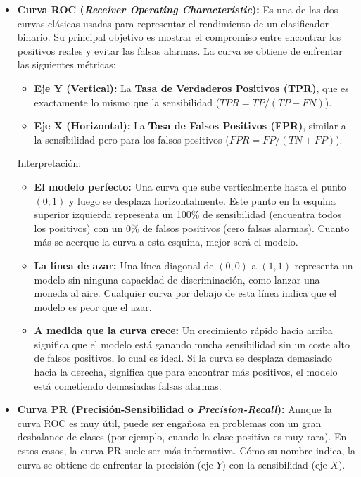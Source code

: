 \begin{itemize}
	\item \textbf{Curva ROC (\textit{Receiver Operating Characteristic}):} Es una de las dos curvas clásicas usadas para representar el rendimiento de un clasificador binario. Su principal objetivo es mostrar el compromiso entre encontrar los positivos reales y evitar las falsas alarmas. La curva se obtiene de enfrentar las siguientes métricas:
	
	\begin{itemize}
		\item \textbf{Eje Y (Vertical):} La \textbf{Tasa de Verdaderos Positivos (TPR)}, que es exactamente lo mismo que la sensibilidad ($TPR = TP/(TP + FN)$).
		
		\item \textbf{Eje X (Horizontal):} La \textbf{Tasa de Falsos Positivos (FPR)}, similar a la sensibilidad pero para los falsos positivos ($FPR = FP/(TN + FP)$).
	\end{itemize}
	
	
	Interpretación:
	
	\begin{itemize}
		\item \textbf{El modelo perfecto:} Una curva que sube verticalmente hasta el punto $(0, 1)$ y luego se desplaza horizontalmente. Este punto en la esquina superior izquierda representa un 100\% de sensibilidad (encuentra todos los positivos) con un 0\% de falsos positivos (cero falsas alarmas). Cuanto más se acerque la curva a esta esquina, mejor será el modelo.
		
		\item \textbf{La línea de azar:} Una línea diagonal de $(0,0)$ a $(1,1)$ representa un modelo sin ninguna capacidad de discriminación, como lanzar una moneda al aire. Cualquier curva por debajo de esta línea indica que el modelo es peor que el azar.
		
		\item \textbf{A medida que la curva crece:} Un crecimiento rápido hacia arriba significa que el modelo está ganando mucha sensibilidad sin un coste alto de falsos positivos, lo cual es ideal. Si la curva se desplaza demasiado hacia la derecha, significa que para encontrar más positivos, el modelo está cometiendo demasiadas falsas alarmas.
	\end{itemize}
	
	\item \textbf{Curva PR (Precisión-Sensibilidad o \textit{Precision-Recall}):} Aunque la curva ROC es muy útil, puede ser engañosa en problemas con un gran desbalance de clases (por ejemplo, cuando la clase positiva es muy rara). En estos casos, la curva PR suele ser más informativa. Cómo su nombre indica, la curva se obtiene de enfrentar la precisión (eje $Y$) con la sensibilidad (eje $X$).
	

\end{itemize}
